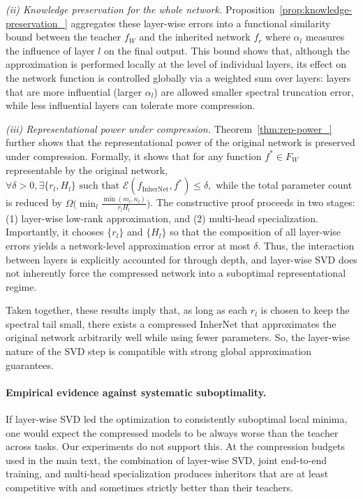 \documentclass{article} %
\begin{document}
\emph{(ii) Knowledge preservation for the whole network.}
Proposition~\ref{prop:knowledge-preservation_} aggregates these layer-wise errors into a functional similarity bound between the teacher $f_W$ and the inherited network $f_r$ where $\alpha_l$ measures the influence of layer $l$ on the final output. This bound shows that, although the approximation is performed locally at the level of individual layers, its effect on the network function is controlled globally via a weighted sum over layers: layers that are more influential (larger $\alpha_l$) are allowed smaller spectral truncation error, while less influential layers can tolerate more compression.

\emph{(iii) Representational power under compression.}
Theorem~\ref{thm:rep-power_} further shows that the representational power of the original network is preserved under compression. Formally, it shows that for any function $f^* \in F_W$ representable by the original network, $\forall \delta > 0, \exists\{r_l,H_l\} \text{ such that } \mathcal{E}(f_{\text{InherNet}}, f^*) \le \delta,$ while the total parameter count is reduced by $\Omega \big(\min_l \frac{\min(m_l,n_l)}{r_l H_l}\big)$.
The constructive proof proceeds in two stages: (1) layer-wise low-rank approximation, and (2) multi-head specialization. Importantly, it chooses $\{r_l\}$ and $\{H_l\}$ so that the composition of all layer-wise errors yields a network-level approximation error at most $\delta$. Thus, the interaction between layers is explicitly accounted for through depth, and layer-wise SVD does not inherently force the compressed network into a suboptimal representational regime.

Taken together, these results imply that, as long as each $r_l$ is chosen to keep the spectral tail small, there exists a compressed InherNet that approximates the original network arbitrarily well while using fewer parameters. So, the layer-wise nature of the SVD step is compatible with strong global approximation guarantees.

\paragraph{Empirical evidence against systematic suboptimality.}
If layer-wise SVD led the optimization to consistently suboptimal local minima, one would expect the compressed models to be always worse than the teacher across tasks. Our experiments do not support this. At the compression budgets used in the main text, the combination of layer-wise SVD, joint end-to-end training, and multi-head specialization produces inheritors that are at least competitive with and sometimes strictly better than their teachers.
\end{document}
